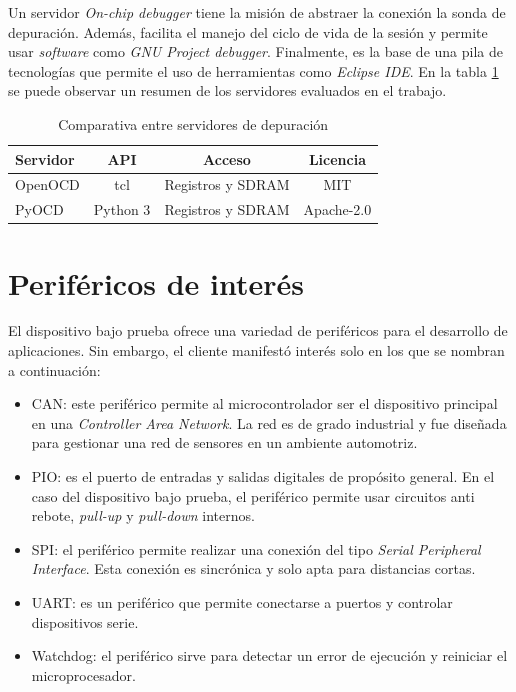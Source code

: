 Un servidor \emph{On-chip debugger} tiene la misión de abstraer la conexión la sonda de depuración.
Además, facilita el manejo del ciclo de vida de la sesión y permite usar \emph{software} como \emph{GNU Project debugger}.
Finalmente, es la base de una pila de tecnologías que permite el uso de herramientas como \emph{Eclipse IDE}.
En la tabla \ref{tab:servidores} se puede observar un resumen de los servidores evaluados en el trabajo.

\begin{table}[h]
	\centering
	\caption[Servidores de depuración]{Comparativa entre servidores de depuración}
	\begin{tabular}{l c c c}    
		\toprule
        \textbf{Servidor} & \textbf{API} & \textbf{Acceso}   & \textbf{Licencia}\\
		\midrule
        OpenOCD           & tcl                         & Registros y SDRAM & MIT\\        	
        PyOCD             & Python 3                    & Registros y SDRAM & Apache-2.0\\
		\bottomrule
		\hline
	\end{tabular}
	\label{tab:servidores}
\end{table}

\section{Periféricos de interés}
\label{sec:perifericos}

El dispositivo bajo prueba ofrece una variedad de periféricos para el desarrollo de aplicaciones.
Sin embargo, el cliente manifestó interés solo en los que se nombran a continuación:
\begin{itemize}
    \item CAN: este periférico permite al microcontrolador ser el dispositivo principal en una \emph{Controller Area Network}. La red es de grado industrial y fue diseñada para gestionar una red de sensores en un ambiente automotriz.
    \item PIO: es el puerto de entradas y salidas digitales de propósito general. En el caso del dispositivo bajo prueba, el periférico permite usar circuitos anti rebote, \emph{pull-up} y \emph{pull-down} internos. 
    \item SPI: el periférico permite realizar una conexión del tipo \emph{Serial Peripheral Interface}. Esta conexión es sincrónica y solo apta para distancias cortas.
    \item UART: es un periférico que permite conectarse a puertos y controlar dispositivos serie.
    \item Watchdog: el periférico sirve para detectar un error de ejecución y reiniciar el microprocesador.
\end{itemize}

